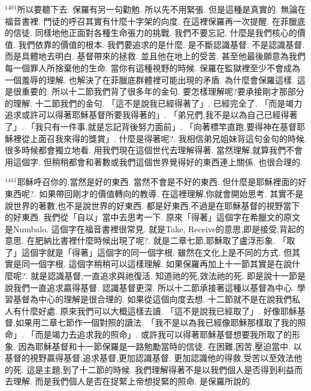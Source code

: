 \documentclass{book}
\begin{document}
$^{1401}$所以要聽下去.
保羅有另一句勸勉.
所以先不用緊張.
但是這種是真實的.
無論在福音書裡.
門徒的呼召其實有什麼十字架的向度.
在這裡保羅再一次提醒.
在菲臘底的信徒.
同樣地他正面對各種生命張力的挑戰.
我們不要忘記.
什麼是我們核心的價值.
我們依靠的價值的根本.
我們要追求的是什麼.
是不斷認識基督.
不是認識基督.
而是具體地去明白.
基督帶來的拯救.
並且他在地上的受苦.
甚至他最後願意為我們每一個罪人所捨棄他的生命.
當你有這種視野的時候.
保羅在監獄裡至少不會成為一個羞辱的理解.
也解決了在菲臘底群體裡可能出現的矛盾.
為什麼會保羅這樣.
這是很重要的.
所以十二節我們背了很多年的金句.
要怎樣理解呢?要承接剛才那部分的理解.
十二節我們的金句.
「這不是說我已經得著了」.
已經完全了.
「而是竭力追求或許可以得著耶穌基督所要我得著的」.
「弟兄們,我不是以為自己已經得著了」.
「我只有一件事,就是忘記背後努力面前」.
「向著標竿直跑,要得神在基督耶穌裡從上面召我來得的獎賞」.
什麼是得著呢?.
我相信弟兄姐妹背這句金句的時候.
很多時候都會獨立地看.
用我們現在這個世代去理解得著.
當然理解,就算我們不會用這個字.
但稍稍都會和著數或我們這個世界覺得好的東西連上關係.
也很合理的.

$^{1441}$耶穌呼召你的,當然是好的東西.
當然不會是不好的東西.
但什麼是耶穌裡面的好東西呢?.
如果帶回剛才的價值轉向的教導.
在這裡理解,你就會開始思考.
其實不是說世界的著數,也不是說世界的好東西.
都是好東西,不過是在耶穌基督的視野當下的好東西.
我們從「自以」當中去思考一下.
原來「得著」這個字在希臘文的原文是Numbalo.
這個字在福音書裡很常見.
就是Take, Receive的意思,即是接受,背起的意思.
在肥納比書裡什麼時候出現了呢?.
就是二章七節,耶穌取了盧浮形象.
「取了」這個字就是「得著」這個字的同一個字根.
雖然在文化上是不同的方式.
但其實是同一個字根.
這個字稍稍可以這樣理解.
如果保羅再加上十一節其實是在說什麼呢?.
就是認識基督,一直追求與祂復活.
知道祂的死,效法祂的死.
即是說十一節是說我們一直追求贏得基督.
認識基督更深.
所以十二節承接著這種以基督為中心.
學習基督為中心的理解是很合理的.
如果從這個向度去想.
十二節就不是在說我們私人有什麼好處.
原來我們可以大概這樣去讀.
「這不是說我已經取了」.
好像耶穌基督,如果用二章七節作一個對照的讀法.
「我不是以為我已經像耶穌那樣取了我的照命」.
「而是竭力去追求我的照命」.
或許我可以得著耶穌基督想要我所取了的形象.
因為耶穌基督和十一節保羅是一路勉勵當時的信徒.
在困難,困苦,壓迫當中.
以基督的視野贏得基督,追求基督,更加認識基督.
更加認識他的得救,受苦以至效法他的死.
這是主題,到了十二節的時候.
我們理解得著不是以我們個人是否得到利益而去理解.
而是我們個人是否在捉緊上帝想捉緊的照命.
是保羅所說的.
\end{document}

